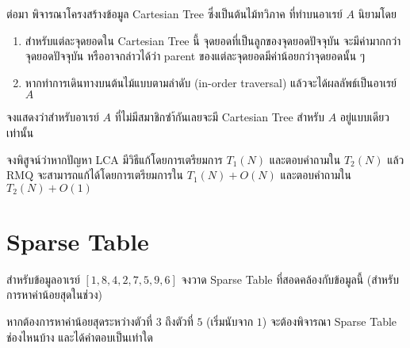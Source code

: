 ต่อมา พิจารณาโครงสร้างข้อมูล Cartesian Tree ซึ่งเป็นต้นไม้ทวิภาค ที่ทำบนอาเรย์ $A$ นิยามโดย

\begin{enumerate}
    \item สำหรับแต่ละจุดยอดใน Cartesian Tree นี้ จุดยอดที่เป็นลูกของจุดยอดปัจจุบัน จะมีค่ามากกว่าจุดยอดปัจจุบัน หรืออาจกล่าวได้ว่า parent ของแต่ละจุดยอดมีค่าน้อยกว่าจุดยอดนั้น ๆ
    \item หากทำการเดินทางบนต้นไม้แบบตามลำดับ (in-order traversal) แล้วจะได้ผลลัพธ์เป็นอาเรย์ $A$
\end{enumerate}

\begin{exercise}
จงแสดงว่าสำหรับอาเรย์ $A$ ที่ไม่มีสมาชิกซำ้กันเลยจะมี Cartesian Tree สำหรับ $A$ อยู่แบบเดียวเท่านั้น
\end{exercise}




\begin{exercise}
จงพิสูจน์ว่าหากปัญหา LCA มีวิธีแก้โดยการเตรียมการ $T_1(N)$ และตอบคำถามใน $T_2(N)$ แล้ว RMQ จะสามารถแก้ได้โดยการเตรียมการใน $T_1(N) + O(N)$ และตอบคำถามใน $T_2(N) + O(1)$
\end{exercise}

\section{Sparse Table}

\begin{exercise}
สำหรับข้อมูลอาเรย์ $[1, 8, 4, 2, 7, 5, 9, 6]$ จงวาด Sparse Table ที่สอดคล้องกับข้อมูลนี้ (สำหรับการหาค่าน้อยสุดในช่วง)
\end{exercise}

\begin{exercise}
หากต้องการหาค่าน้อยสุดระหว่างตัวที่ $3$ ถึงตัวที่ $5$ (เริ่มนับจาก $1$) จะต้องพิจารณา Sparse Table ช่องไหนบ้าง และได้คำตอบเป็นเท่าใด
\end{exercise}
